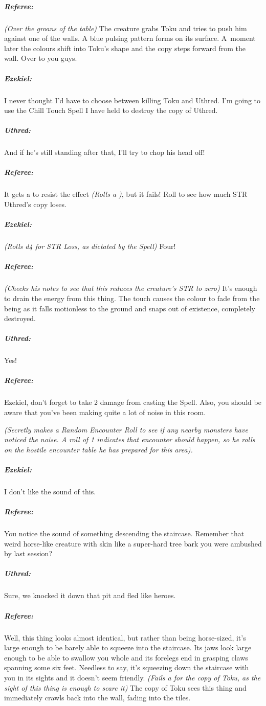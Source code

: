 \documentclass[itdr/core]{subfiles}
\begin{document}
{\subparagraph{Referee:} {\em (Over the groans of the table)} The creature
grabs Toku and tries to push him against one of the walls. A blue pulsing pattern forms on its surface. A~moment later the colours shift into Toku's shape and the copy steps forward from the wall. Over to you guys.

\subparagraph{Ezekiel:} I never thought I'd have to choose between killing Toku and Uthred. I'm going to use the Chill Touch Spell I have held to destroy the copy of Uthred.

\subparagraph{Uthred:} And if he's still standing after that, I'll try to chop his head off!

\vfill
\break

\subparagraph{Referee:} It gets a  to resist the effect {\em (Rolls a )}, but it fails! Roll to see how much STR Uthred's copy loses.

\subparagraph{Ezekiel:} {\em (Rolls d4 for STR Loss, as dictated by the
Spell)} Four!

\subparagraph{Referee:} {\em (Checks his notes to see that this reduces the creature's STR to zero)} It's enough to drain the energy from this thing. The touch causes the colour to fade from the being as it falls motionless to the ground and snaps out of existence, completely destroyed.

\subparagraph{Uthred:} Yes!

\subparagraph{Referee:} Ezekiel, don't forget to take 2 damage from casting the Spell. Also, you should be aware that you've been making quite a lot of noise in this room.

{\em (Secretly makes a Random Encounter Roll to see if any nearby monsters have noticed the noise. A roll of 1 indicates that encounter should happen, so he rolls on the hostile encounter table he has prepared for this area).}

\subparagraph{Ezekiel:} I don't like the sound of this.

\subparagraph{Referee:} You notice the sound of something descending the staircase. Remember that weird horse-like creature with skin like a super-hard tree bark you were ambushed by last session?

\subparagraph{Uthred:} Sure, we knocked it down that pit and fled like heroes.

\subparagraph{Referee:} Well, this thing looks almost identical, but rather than being horse-sized, it's large enough to be barely able to squeeze into the staircase. Its jaws look large enough to be able to swallow you whole and its forelegs end in grasping claws spanning some six feet. Needless to say, it's squeezing down the staircase with you in its sights and it doesn't seem friendly. {\em (Fails a  for the copy of Toku, as the sight of this thing is enough to scare it)} The copy of Toku sees this thing and immediately crawls back into the wall, fading into the tiles.

}
\end{document}
